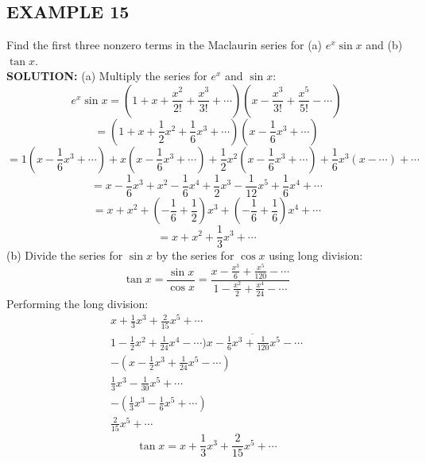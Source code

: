\documentclass{article}
\theoremstyle{mystyle}
\begin{document}
\subsection*{EXAMPLE 15}
Find the first three nonzero terms in the Maclaurin series for (a) \(e^x \sin x\) and (b) \(\tan x\).\\
\textbf{SOLUTION:}
(a) Multiply the series for \(e^x\) and \(\sin x\):
\[ e^x \sin x = \left( 1 + x + \dfrac{x^2}{2!} + \dfrac{x^3}{3!} + \cdots \right) \left( x - \dfrac{x^3}{3!} + \dfrac{x^5}{5!} - \cdots \right) \]
\[ = (1+x+\frac{1}{2}x^2+\frac{1}{6}x^3+\cdots)(x-\frac{1}{6}x^3+\cdots) \]
\[ = 1(x-\frac{1}{6}x^3+\cdots) + x(x-\frac{1}{6}x^3+\cdots) + \frac{1}{2}x^2(x-\frac{1}{6}x^3+\cdots) + \frac{1}{6}x^3(x-\cdots) + \cdots \]
\[ = x - \frac{1}{6}x^3 + x^2 - \frac{1}{6}x^4 + \frac{1}{2}x^3 - \frac{1}{12}x^5 + \frac{1}{6}x^4 + \cdots \]
\[ = x + x^2 + \left(-\frac{1}{6} + \frac{1}{2}\right)x^3 + \left(-\frac{1}{6} + \frac{1}{6}\right)x^4 + \cdots \]
\[ = x + x^2 + \dfrac{1}{3}x^3 + \cdots \]
(b) Divide the series for \(\sin x\) by the series for \(\cos x\) using long division:
\[ \tan x = \dfrac{\sin x}{\cos x} = \dfrac{x - \frac{x^3}{6} + \frac{x^5}{120} - \cdots}{1 - \frac{x^2}{2} + \frac{x^4}{24} - \cdots} \]
Performing the long division:
\[\begin{array}{r} %
    x + \frac{1}{3}x^3 + \frac{2}{15}x^5 + \cdots \\
    1 - \frac{1}{2}x^2 + \frac{1}{24}x^4 - \cdots \overline{) x - \frac{1}{6}x^3 + \frac{1}{120}x^5 - \cdots} \\ %
    -(x - \frac{1}{2}x^3 + \frac{1}{24}x^5 - \cdots) \\
    \hline %
    \frac{1}{3}x^3 - \frac{1}{30}x^5 + \cdots \\
    -(\frac{1}{3}x^3 - \frac{1}{6}x^5 + \cdots) \\
    \hline %
    \frac{2}{15}x^5 + \cdots
\end{array}\]
    \[ \tan x = x + \dfrac{1}{3}x^3 + \dfrac{2}{15}x^5 + \cdots \]
\end{document}
